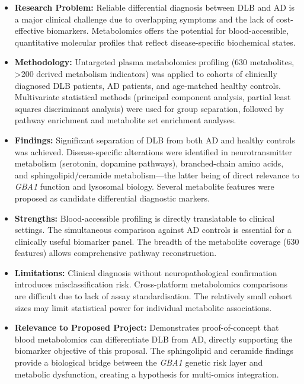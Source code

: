 \begin{itemize}
    \item \textbf{Research Problem:} Reliable differential diagnosis between DLB and AD is a major clinical challenge due to overlapping symptoms and the lack of cost-effective biomarkers. Metabolomics offers the potential for blood-accessible, quantitative molecular profiles that reflect disease-specific biochemical states.
    \item \textbf{Methodology:} Untargeted plasma metabolomics profiling (630 metabolites, >200 derived metabolism indicators) was applied to cohorts of clinically diagnosed DLB patients, AD patients, and age-matched healthy controls. Multivariate statistical methods (principal component analysis, partial least squares discriminant analysis) were used for group separation, followed by pathway enrichment and metabolite set enrichment analyses.
    \item \textbf{Findings:} Significant separation of DLB from both AD and healthy controls was achieved. Disease-specific alterations were identified in neurotransmitter metabolism (serotonin, dopamine pathways), branched-chain amino acids, and sphingolipid/ceramide metabolism---the latter being of direct relevance to \textit{GBA1} function and lysosomal biology. Several metabolite features were proposed as candidate differential diagnostic markers.
    \item \textbf{Strengths:} Blood-accessible profiling is directly translatable to clinical settings. The simultaneous comparison against AD controls is essential for a clinically useful biomarker panel. The breadth of the metabolite coverage (630 features) allows comprehensive pathway reconstruction.
    \item \textbf{Limitations:} Clinical diagnosis without neuropathological confirmation introduces misclassification risk. Cross-platform metabolomics comparisons are difficult due to lack of assay standardisation. The relatively small cohort sizes may limit statistical power for individual metabolite associations.
    \item \textbf{Relevance to Proposed Project:} Demonstrates proof-of-concept that blood metabolomics can differentiate DLB from AD, directly supporting the biomarker objective of this proposal. The sphingolipid and ceramide findings provide a biological bridge between the \textit{GBA1} genetic risk layer and metabolic dysfunction, creating a hypothesis for multi-omics integration.
\end{itemize}


